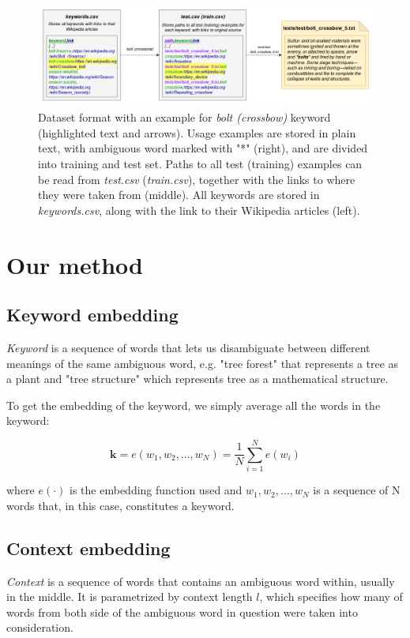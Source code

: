 \documentclass{llncs}
\begin{document}
\begin{figure}
    \centering
    \caption{Dataset format with an example for \textit{bolt (crossbow)} keyword (highlighted text and arrows). Usage examples are stored in plain text, with ambiguous word marked with "*" (right), and are divided into training and test set. Paths to all test (training) examples can be read from \textit{test.csv} (\textit{train.csv}), together with the links to where they were taken from (middle). All keywords are stored in \textit{keywords.csv}, along with the link to their Wikipedia articles (left).}
    \label{fig:dataset_format}
    \includegraphics[scale=0.35]{res/dataset_format.png}
\end{figure}


\section{Our method}
\subsection{Keyword embedding}
\label{sec:kw_embed}
\textit{Keyword} is a sequence of words that lets us disambiguate between different meanings of the same ambiguous word, e.g. "tree forest" that represents a tree as a plant and "tree structure" which represents tree as a mathematical structure.

To get the embedding of the keyword, we simply average all the words in the keyword:

\begin{equation}
    \label{eq:keyword_embedding}
    \bm{k} = e(w_1, w_2, ..., w_N) = \frac{1}{N}\sum_{i=1}^{N} e(w_i)
\end{equation}

where \(e(\cdot)\) is the embedding function used and \(w_1, w_2, ..., w_N\) is a sequence of N words that, in this case, constitutes a keyword.

\subsection{Context embedding}
\label{sec:ctx_embed}
\textit{Context} is a sequence of words that contains an ambiguous word within, usually in the middle.
It is parametrized by context length \(l\), which specifies how many of words from both side of the ambiguous word in question were taken into consideration.
\end{document}
